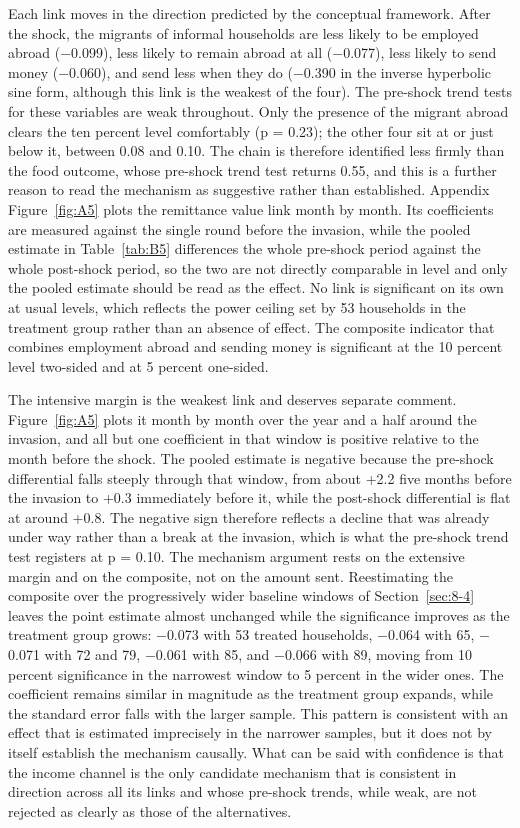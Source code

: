 Each link moves in the direction predicted by the conceptual framework. After the shock, the migrants of informal households are less likely to be employed abroad ($-$0.099), less likely to remain abroad at all ($-$0.077), less likely to send money ($-$0.060), and send less when they do ($-$0.390 in the inverse hyperbolic sine form, although this link is the weakest of the four). The pre-shock trend tests for these variables are weak throughout. Only the presence of the migrant abroad clears the ten percent level comfortably (p = 0.23); the other four sit at or just below it, between 0.08 and 0.10. The chain is therefore identified less firmly than the food outcome, whose pre-shock trend test returns 0.55, and this is a further reason to read the mechanism as suggestive rather than established. Appendix Figure~\ref{fig:A5} plots the remittance value link month by month. Its coefficients are measured against the single round before the invasion, while the pooled estimate in Table~\ref{tab:B5} differences the whole pre-shock period against the whole post-shock period, so the two are not directly comparable in level and only the pooled estimate should be read as the effect. No link is significant on its own at usual levels, which reflects the power ceiling set by 53 households in the treatment group rather than an absence of effect. The composite indicator that combines employment abroad and sending money is significant at the 10 percent level two-sided and at 5 percent one-sided.

The intensive margin is the weakest link and deserves separate comment. Figure~\ref{fig:A5} plots it month by month over the year and a half around the invasion, and all but one coefficient in that window is positive relative to the month before the shock. The pooled estimate is negative because the pre-shock differential falls steeply through that window, from about +2.2 five months before the invasion to +0.3 immediately before it, while the post-shock differential is flat at around +0.8. The negative sign therefore reflects a decline that was already under way rather than a break at the invasion, which is what the pre-shock trend test registers at p = 0.10. The mechanism argument rests on the extensive margin and on the composite, not on the amount sent. Reestimating the composite over the progressively wider baseline windows of Section~\ref{sec:8-4} leaves the point estimate almost unchanged while the significance improves as the treatment group grows: $-$0.073 with 53 treated households, $-$0.064 with 65, $-$0.071 with 72 and 79, $-$0.061 with 85, and $-$0.066 with 89, moving from 10 percent significance in the narrowest window to 5 percent in the wider ones. The coefficient remains similar in magnitude as the treatment group expands, while the standard error falls with the larger sample. This pattern is consistent with an effect that is estimated imprecisely in the narrower samples, but it does not by itself establish the mechanism causally. What can be said with confidence is that the income channel is the only candidate mechanism that is consistent in direction across all its links and whose pre-shock trends, while weak, are not rejected as clearly as those of the alternatives.

